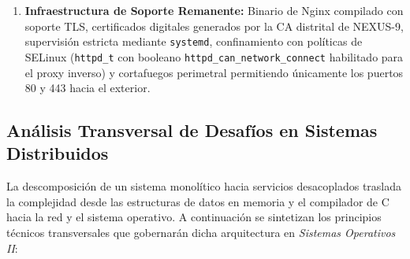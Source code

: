 \documentclass[10pt,a4paper]{article}
\begin{document}
\begin{enumerate}[leftmargin=*]
\begin{itemize}[leftmargin=*]
    \end{itemize}
    \item \textbf{Infraestructura de Soporte Remanente:} Binario de Nginx compilado con soporte TLS, certificados digitales generados por la CA distrital de NEXUS-9, supervisión estricta mediante \texttt{systemd}, confinamiento con políticas de SELinux (\texttt{httpd\_t} con booleano \texttt{httpd\_can\_network\_connect} habilitado para el proxy inverso) y cortafuegos perimetral permitiendo únicamente los puertos 80 y 443 hacia el exterior.
\end{enumerate}

\subsection{Análisis Transversal de Desafíos en Sistemas Distribuidos}

La descomposición de un sistema monolítico hacia servicios desacoplados traslada la complejidad desde las estructuras de datos en memoria y el compilador de C hacia la red y el sistema operativo. A continuación se sintetizan los principios técnicos transversales que gobernarán dicha arquitectura en \textit{Sistemas Operativos II}:
\end{document}
